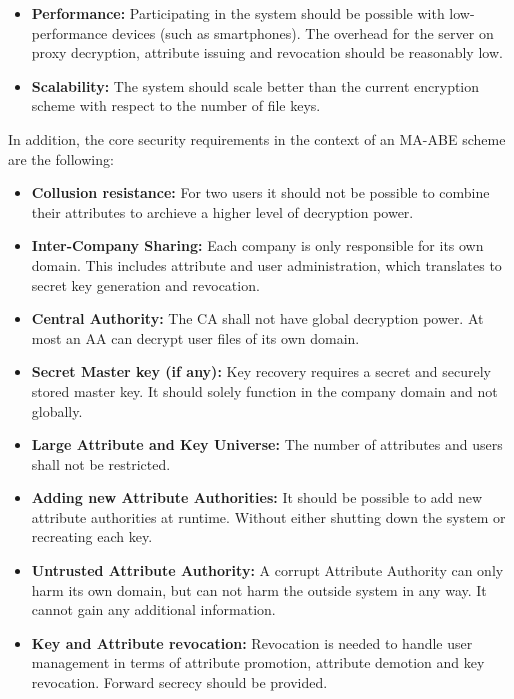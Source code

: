 \documentclass[twocolumn]{article}
\begin{document}
\begin{itemize}
	\item \textbf{Performance:} Participating in the system should be possible with low-performance devices (such as smartphones). The overhead for the server on proxy decryption, attribute issuing and revocation should be reasonably low.  
	\item \textbf{Scalability:} The system should scale better than the current encryption scheme with respect to the number of file keys. 
\end{itemize}

In addition, the core security requirements in the context of an MA-ABE scheme are the following:
\begin{itemize}
\item \textbf{Collusion resistance:} For two users it should not be possible to combine their attributes to archieve a higher level of decryption power.
\item \textbf{Inter-Company Sharing:} Each company is only responsible for its own domain. This includes attribute and user administration, which translates to secret key generation and revocation. %
\item \textbf{Central Authority:} The CA shall not have global decryption power. At most an AA can decrypt user files of its own domain.  
\item \textbf{Secret Master key (if any):} Key recovery requires a secret and securely stored master key. It should solely function in the company domain and not globally. 
\item \textbf{Large Attribute and Key Universe:} The number of attributes and users shall not be restricted.
\item \textbf{Adding new Attribute Authorities:} It should be possible to add new attribute authorities at runtime. Without either shutting down the system or recreating each key.
\item \textbf{Untrusted Attribute Authority:} A corrupt Attribute Authority can only harm its own domain, but can not harm the outside system in any way. It cannot gain any additional information.
\item \textbf{Key and Attribute revocation:} Revocation is needed to handle user management in terms of attribute promotion, attribute demotion and key revocation. Forward secrecy should be provided. 
\end{itemize}
\end{document}
